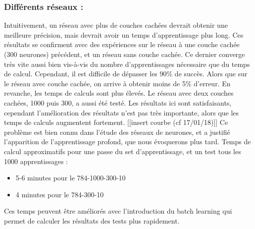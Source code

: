 \subsubsection*{Différents réseaux :} 
Intuitivement, un réseau avec plus de couches cachées devrait obtenir une meilleure précision, mais devrait avoir un temps d’apprentissage plus long. Ces résultats se confirment avec des expériences sur le réseau à une couche cachée (300 neurones) précédent, et un réseau sans couche cachée. Ce dernier converge très vite aussi bien vis-à-vis du nombre d’apprentissages nécessaire que du temps de calcul. Cependant, il est difficile de dépasser les 90\% de succès. Alors que sur le réseau avec couche cachée, on arrive à obtenir moins de 5\% d’erreur. En revanche, les temps de calculs sont plus élevés. Le réseau avec deux couches cachées, 1000 puis 300, a aussi été testé. Les résultats ici sont satisfaisants, cependant l’amélioration des résultats n’est pas très importante, alors que les temps de calculs augmentent fortement.
[[insert courbe (cf 17/01/18)]]
Ce problème est bien connu dans l'étude des réseaux de neurones, et a justifié l'apparition de l'apprentissage profond, que nous évoquerons plus tard.
Temps de calcul approximatifs pour une passe du set d’apprentissage, et un test tous les 1000 apprentissages :
\begin{itemize}
	\item 5-6 minutes pour le 784-1000-300-10
	\item 4 minutes pour le 784-300-10 
\end{itemize}
Ces temps peuvent être améliorés avec l’introduction du batch learning qui permet de calculer les résultats des tests plus rapidement.